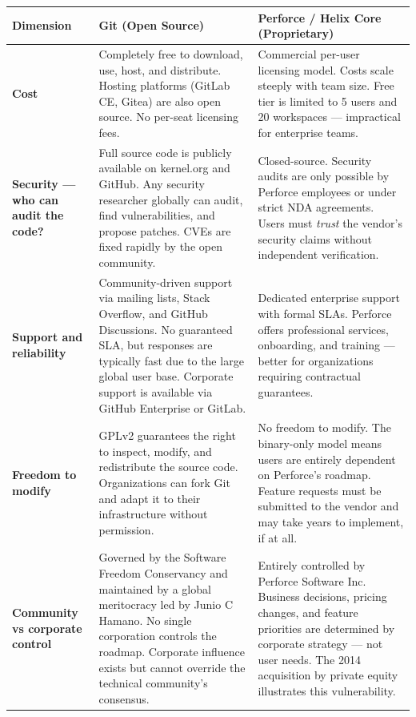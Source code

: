 \begin{table}[h!]
\centering
\small
\renewcommand{\arraystretch}{1.6}
\begin{tabular}{@{}p{3.2cm} p{5.5cm} p{5.5cm}@{}}
\toprule
\textbf{Dimension} & \textbf{Git (Open Source)} & \textbf{Perforce / Helix Core (Proprietary)} \\
\midrule

\textbf{Cost} &
Completely free to download, use, host, and distribute. Hosting platforms (GitLab CE, Gitea)
are also open source. No per-seat licensing fees. &
Commercial per-user licensing model. Costs scale steeply with team size. Free tier is
limited to 5 users and 20 workspaces — impractical for enterprise teams. \\

\textbf{Security — who can audit the code?} &
Full source code is publicly available on kernel.org and GitHub. Any security researcher
globally can audit, find vulnerabilities, and propose patches. CVEs are fixed rapidly by
the open community. &
Closed-source. Security audits are only possible by Perforce employees or under strict
NDA agreements. Users must \emph{trust} the vendor's security claims without independent
verification. \\

\textbf{Support and reliability} &
Community-driven support via mailing lists, Stack Overflow, and GitHub Discussions.
No guaranteed SLA, but responses are typically fast due to the large global user base.
Corporate support is available via GitHub Enterprise or GitLab. &
Dedicated enterprise support with formal SLAs. Perforce offers professional services,
onboarding, and training — better for organizations requiring contractual guarantees. \\

\textbf{Freedom to modify} &
GPLv2 guarantees the right to inspect, modify, and redistribute the source code.
Organizations can fork Git and adapt it to their infrastructure without permission. &
No freedom to modify. The binary-only model means users are entirely dependent on
Perforce's roadmap. Feature requests must be submitted to the vendor and may take years
to implement, if at all. \\

\textbf{Community vs corporate control} &
Governed by the Software Freedom Conservancy and maintained by a global meritocracy
led by Junio C Hamano. No single corporation controls the roadmap. Corporate influence
exists but cannot override the technical community's consensus. &
Entirely controlled by Perforce Software Inc. Business decisions, pricing changes, and
feature priorities are determined by corporate strategy — not user needs. The 2014
acquisition by private equity illustrates this vulnerability. \\


\end{tabular}
\end{table}
